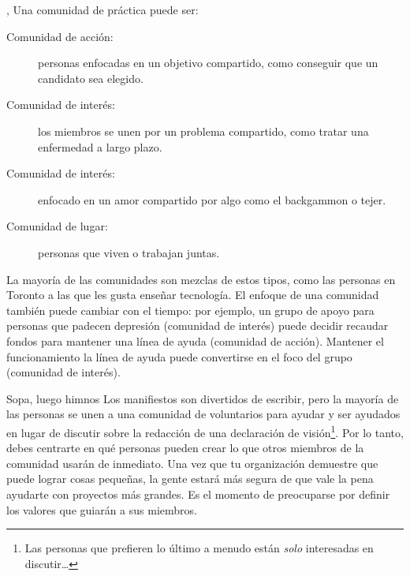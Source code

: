 ,
Una comunidad de práctica puede ser:

\begin{description}
\item[Comunidad de acción:]
  personas enfocadas en un objetivo compartido,
  como conseguir que un candidato sea elegido.

\item[Comunidad de interés:]
  los miembros se unen por un problema compartido,
  como tratar una enfermedad a largo plazo.

\item[Comunidad de interés:]
  enfocado en un amor compartido por algo como el backgammon o tejer.

\item[Comunidad de lugar:]
  personas que viven o trabajan juntas.

\end{description}
  
La mayoría de las comunidades son mezclas de estos tipos,
como las personas en Toronto a las que les gusta enseñar tecnología.
El enfoque de una comunidad también puede cambiar con el tiempo:
por ejemplo,
un grupo de apoyo para personas que padecen depresión (comunidad de interés)
puede decidir recaudar fondos para mantener una línea de ayuda (comunidad de acción).
Mantener el funcionamiento la línea de ayuda puede convertirse en el foco del grupo (comunidad de interés).

\begin{aside}{Sopa, luego himnos}
  Los manifiestos son divertidos de escribir,
  pero la mayoría de las personas se unen a una comunidad de voluntarios para ayudar y ser ayudados
  en lugar de discutir sobre la redacción de una declaración de visión\footnote{
    Las personas que prefieren lo último a menudo están \emph{solo} interesadas en discutir{\ldots}}.
  Por lo tanto, debes centrarte en
  qué personas pueden crear lo que otros miembros de la comunidad usarán de inmediato.
  Una vez que tu organización demuestre que puede lograr cosas pequeñas,
  la gente estará más segura de que vale la pena ayudarte con proyectos más grandes.
  Es el momento de preocuparse por definir los valores que guiarán a sus miembros.
\end{aside}


